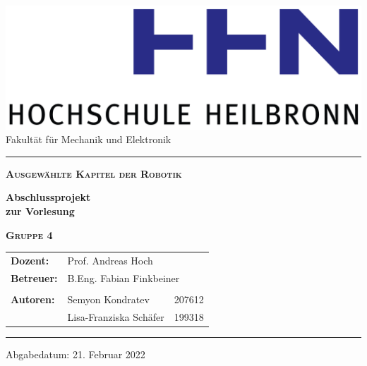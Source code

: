\thispagestyle{plain}
\begin{titlepage}
\begin{center}
\centering
\includegraphics[scale=0.57]{grafic/logo_hhn_titlepage_new} \\
\vspace{0.2cm}
\large Fakultät für Mechanik und Elektronik
\vspace{0.5cm}
\hrule

\vspace{2.5cm}

\LARGE{\textbf{\scshape{Ausgewählte Kapitel der Robotik}}}\\
\vspace{2.1cm}

\Huge{\textbf{Abschlussprojekt\\zur Vorlesung}} \\
\vspace{2.1cm}

\Large{\textbf{\scshape{Gruppe 4}}}\\
\vfill

\begin{table}[!h]
\newlength{\myl}
\settowidth{\myl}{Lecturer:  }
\hspace{-\myl}
\centering
\large
\begin{tabular}{p{2.5cm} p{5.3cm} p{1.8cm}} %
\textbf{Dozent:} & \multicolumn{2}{l}{Prof. Andreas Hoch} \\
\textbf{Betreuer:} & \multicolumn{2}{l}{B.Eng. Fabian Finkbeiner} \\
			     &              	  		&  			\\ 
\textbf{Autoren:}& Semyon Kondratev	& 207612	    \\
	             & Lisa-Franziska Schäfer	& 199318 	\\
\end{tabular}
\end{table}

\large
\vspace{0.5cm}
\hrule
\normalsize
Abgabedatum: 21. Februar 2022%

\end{center}


\thispagestyle{empty}
	
\end{titlepage}
